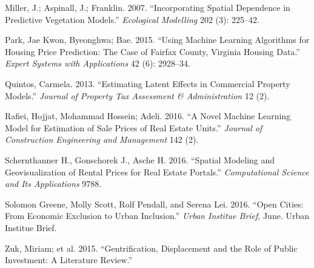 \documentclass[]{article}
\begin{document}
\hypertarget{ref-Miller2015}{}
Miller, J.; Aspinall, J.; Franklin. 2007. ``Incorporating Spatial
Dependence in Predictive Vegetation Models.'' \emph{Ecological
Modelling} 202 (3): 225--42.

\hypertarget{ref-Park2015}{}
Park, Jae Kwon, Byeonghwa; Bae. 2015. ``Using Machine Learning
Algorithms for Housing Price Prediction: The Case of Fairfax County,
Virginia Housing Data.'' \emph{Expert Systems with Applications} 42 (6):
2928--34.

\hypertarget{ref-Quintos2013}{}
Quintos, Carmela. 2013. ``Estimating Latent Effects in Commercial
Property Models.'' \emph{Journal of Property Tax Assessment \&
Administration} 12 (2).

\hypertarget{ref-Rafiei2016}{}
Rafiei, Hojjat, Mohammad Hossein; Adeli. 2016. ``A Novel Machine
Learning Model for Estimation of Sale Prices of Real Estate Units.''
\emph{Journal of Construction Engineering and Management} 142 (2).

\hypertarget{ref-Schernthanner2016}{}
Schernthanner H., Gonschorek J., Asche H. 2016. ``Spatial Modeling and
Geovisualization of Rental Prices for Real Estate Portals.''
\emph{Computational Science and Its Applications} 9788.

\hypertarget{ref-urban2016}{}
Solomon Greene, Molly Scott, Rolf Pendall, and Serena Lei. 2016. ``Open
Cities: From Economic Exclusion to Urban Inclusion.'' \emph{Urban
Institue Brief}, June. Urban Institue Brief.

\hypertarget{ref-Zuk2015}{}
Zuk, Miriam; et al. 2015. ``Gentrification, Displacement and the Role of
Public Investment: A Literature Review.''
\end{document}
